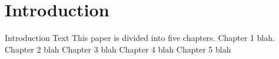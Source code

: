\chapter{Introduction}
\label{chap:introduction}
Introduction Text
This paper is divided into five chapters.
Chapter 1 blah.  
Chapter 2 blah
Chapter 3 blah
Chapter 4 blah
Chapter 5 blah




